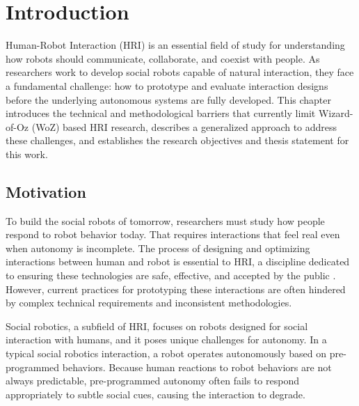 \chapter{Introduction}
\label{ch:intro}

Human-Robot Interaction (HRI) is an essential field of study for understanding how robots should communicate, collaborate, and coexist with people. As researchers work to develop social robots capable of natural interaction, they face a fundamental challenge: how to prototype and evaluate interaction designs before the underlying autonomous systems are fully developed. This chapter introduces the technical and methodological barriers that currently limit Wizard-of-Oz (WoZ) based HRI research, describes a generalized approach to address these challenges, and establishes the research objectives and thesis statement for this work.

\section{Motivation}

To build the social robots of tomorrow, researchers must study how people respond to robot behavior today. That requires interactions that feel real even when autonomy is incomplete. The process of designing and optimizing interactions between human and robot is essential to HRI, a discipline dedicated to ensuring these technologies are safe, effective, and accepted by the public \cite{Bartneck2024}. However, current practices for prototyping these interactions are often hindered by complex technical requirements and inconsistent methodologies.

Social robotics, a subfield of HRI, focuses on robots designed for social interaction with humans, and it poses unique challenges for autonomy. In a typical social robotics interaction, a robot operates autonomously based on pre-programmed behaviors. Because human reactions to robot behaviors are not always predictable, pre-programmed autonomy often fails to respond appropriately to subtle social cues, causing the interaction to degrade.

